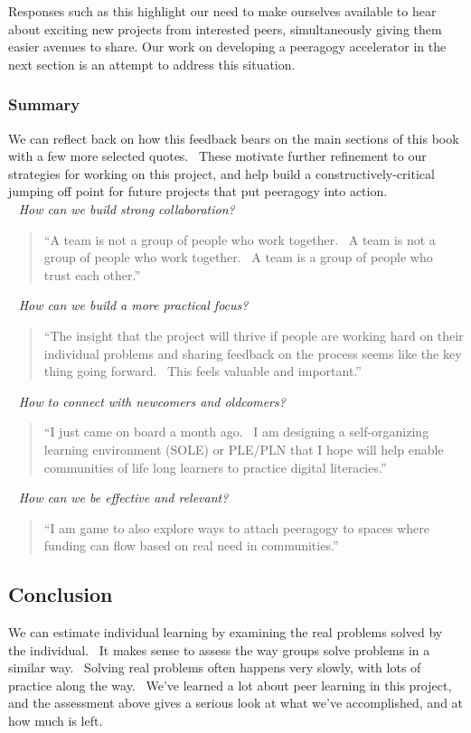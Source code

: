 Responses such as this highlight our need to make ourselves available to
hear about exciting new projects from interested peers, simultaneously
giving them easier avenues to share. Our work on developing a peeragogy
accelerator in the next section is an attempt to address this situation.

\subsubsection{Summary}

\noindent We can reflect back on how this feedback bears on the main sections of
this book with a few more selected quotes.~ These motivate further
refinement to our strategies for working on this project, and help build
a constructively-critical jumping off point for future projects that put
peeragogy into action. \\

~ \emph{How can we build strong
collaboration?} 

\begin{quote}
``A team is not a group of people who work together.~ A
team is not a group of people who work together.~ A team is a group of
people who trust each other.''
\end{quote}

~ \emph{How can we build
a more practical focus?}
\begin{quote}
``The insight that the project will thrive if people are working hard
  on their individual problems and sharing feedback on the process
  seems like the key thing going forward.~ This feels valuable and
  important.''
\end{quote}

~ \emph{How to connect with
  newcomers and oldcomers?}
\begin{quote}
``I just came on board a month ago.~ I am designing a self-organizing
  learning environment (SOLE) or PLE/PLN that I hope will help enable
  communities of life long learners to practice digital literacies.''
\end{quote}

~ \emph{How can we be effective and
relevant?}
\begin{quote}
``I am game to also explore ways to attach peeragogy to spaces where
  funding can flow based on real need in communities.''
\end{quote}

\subsection{Conclusion}

We can estimate individual learning by examining the real problems
solved by the individual.~ It makes sense to assess the way groups solve
problems in a similar way.~ Solving real problems often happens very
slowly, with lots of practice along the way.~ We've learned a lot about
peer learning in this project, and the assessment above gives a serious
look at what we've accomplished, and at how much is left.
